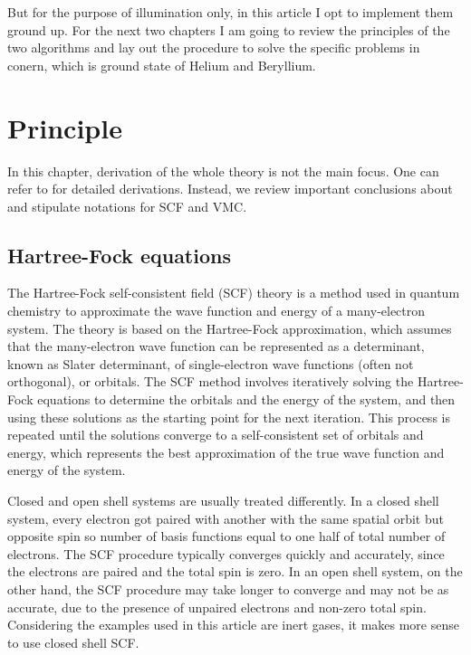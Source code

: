 \documentclass[11pt]{article}
\begin{document}
But for the purpose of illumination only, in this article I opt to implement them ground up. For the next two chapters I am going to review the principles of the two algorithms and lay out the procedure to solve the specific problems in conern, which is ground state of Helium and Beryllium.

\section{Principle}
In this chapter, derivation of the whole theory is not the main focus. One can refer to \cite{Derivation_of_Fock_matrix} \cite{Review_of_VMC} for detailed derivations. Instead, we review important conclusions about and stipulate notations for SCF and VMC.
\subsection{Hartree-Fock equations}
The Hartree-Fock self-consistent field (SCF) theory is a method used in quantum chemistry to approximate the wave function and energy of a many-electron system. 
The theory is based on the Hartree-Fock approximation, which assumes that the many-electron wave function can be represented as a determinant, known as Slater determinant, of single-electron wave functions (often not orthogonal), or orbitals. 
The SCF method involves iteratively solving the Hartree-Fock equations to determine the orbitals and the energy of the system, and then using these solutions as the starting point for the next iteration. 
This process is repeated until the solutions converge to a self-consistent set of orbitals and energy, which represents the best approximation of the true wave function and energy of the system.

Closed and open shell systems are usually treated differently. In a closed shell system, every electron got paired with another with the same spatial orbit but opposite spin so number of basis functions equal to one half of total number of electrons. The SCF procedure typically converges quickly and accurately, since the electrons are paired and the total spin is zero. In an open shell system, on the other hand, the SCF procedure may take longer to converge and may not be as accurate, due to the presence of unpaired electrons and non-zero total spin. \cite{closed-vs-open-shell} Considering the examples used in this article are inert gases, it makes more sense to use closed shell SCF.
\end{document}
